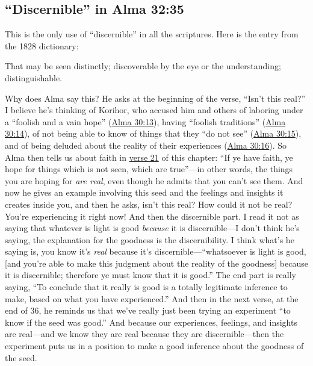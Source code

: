 			\normalsize
		
			\clearpage
	
	\subsection{``Discernible'' in Alma 32:35}
		\label{EXSS-BOM-ALMA-32-DISCERNIBLE}
	
	This is the only use of ``discernible'' in all the scriptures. Here is the entry from the 1828 dictionary:
	
		\begin{compactitem}
			\item That may be seen distinctly; discoverable by the eye or the understanding; distinguishable.
		\end{compactitem}

	Why does Alma say this? He asks at the beginning of the verse, ``Isn't this real?'' I believe he's thinking of Korihor, who accused him and others of laboring under a ``foolish and a vain hope'' (\hyperref[ALMA30-13]{Alma 30:13}), having ``foolish traditions'' (\hyperref[ALMA30-14]{Alma 30:14}), of not being able to know of things that they ``do not see'' (\hyperref[ALMA30-15]{Alma 30:15}), and of being deluded about the reality of their experiences (\hyperref[ALMA30-16]{Alma 30:16}). So Alma then tells us about faith in \hyperref[ALMA-32-21]{verse 21} of this chapter: ``If ye have faith, ye hope for things which is not seen, which are true''---in other words, the things you are hoping for \textit{are real}, even though he admits that you can't see them. And now he gives an example involving this seed and the feelings and insights it creates inside you, and then he asks, isn't this real? How could it not be real? You're experiencing it right now! And then the discernible part. I read it not as saying that whatever is light is good \textit{because} it is discernible---I don't think he's saying, the explanation for the goodness is the discernibility. I think what's he saying is, you know it's \textit{real} because it's discernible---``whatsoever is light is good, [and you're able to make this judgment about the reality of the goodness] because it is discernible; therefore ye must know that it is good.'' The end part is really saying, ``To conclude that it really is good is a totally legitimate inference to make, based on what you have experienced.'' And then in the next verse, at the end of 36, he reminds us that we've really just been trying an experiment ``to know if the seed was good.'' And because our experiences, feelings, and insights are real---and we know they are real because they are discernible---then the experiment puts us in a position to make a good inference about the goodness of the seed.
	
